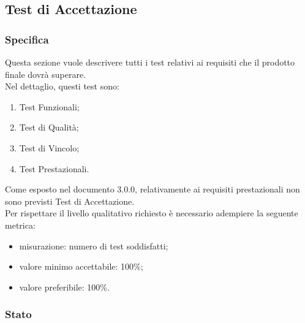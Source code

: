 \subsection{Test di Accettazione}

	\subsubsection{Specifica}
		Questa sezione vuole descrivere tutti i test relativi ai requisiti che il prodotto finale dovrà superare.\\
		Nel dettaglio, questi test sono:
		\begin{enumerate}
			\item Test Funzionali;
			\item Test di Qualità;
			\item Test di Vincolo;
			\item Test Prestazionali.
		\end{enumerate}
		Come esposto nel documento \AdR{} 3.0.0, relativamente ai requisiti prestazionali non sono previsti Test di Accettazione. \\
		Per rispettare il livello qualitativo richiesto è necessario adempiere la seguente metrica:
		\begin{itemize}
			\item{misurazione: numero di test soddisfatti;}
			\item{valore minimo accettabile: 100\%;}
			\item{valore preferibile: 100\%.}
		\end{itemize}
	
	
	\subsubsection{Stato}
			
			\pagebreak
			
			\pagebreak
			